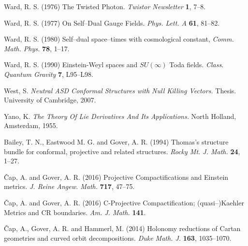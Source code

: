 \begin{thebibliography}{}



 Ward, R. S. (1976)
The Twisted Photon.
\textit{Twistor Newsletter} {\bf 1}, 7--8.

 Ward, R. S. (1977)
On Self--Dual Gauge Fields.
\textit{Phys. Lett. A} {\bf 61}, 81--82.

   Ward, R. S. (1980)
Self--dual space--times with cosmological constant,
\textit{Comm. Math. Phys.} {\bf 78},  1--17.

 Ward, R. S. (1990) Einstein-Weyl spaces and 
$SU(\infty)$ Toda fields. \textit{Class. Quantum Gravity} {\bf 7}, L95--L98.


 West, S. {\em Neutral ASD Conformal Structures with Null Killing Vectors.} Thesis. University of Cambridge, 2007.

 Yano, K. {\em The Theory Of Lie Derivatives And Its Applications.} North Holland, Amsterdam, 1955.




 Bailey, T. N., Eastwood M. G. and Gover, A. R. (1994)
Thomas's structure bundle for conformal, projective
  and related structures. {\em Rocky Mt. J.
    Math.} {\bf 24}, 1--27.
  



 \v Cap, A. and Gover, A. R. (2016)
Projective Compactifications and Einstein metrics.
\textit{J. Reine Angew. Math.} {\bf 717},  47--75.

 \v Cap, A. and Gover, A. R. (2016)
C-Projective Compactification; (quasi--)Kaehler Metrics and CR boundaries.
{\em  Am. J. Math.} {\bf 141}.

 \v Cap, A., Gover, A. R. and Hammerl, M. (2014) 
  Holonomy reductions of Cartan geometries and curved orbit
  decompositions. {\em Duke Math. J.} 
{\bf 163}, 1035--1070.
 
  



\end{thebibliography}
